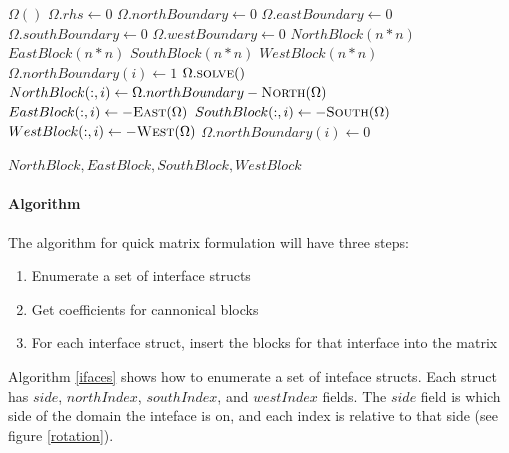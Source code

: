 \documentclass[12pt]{article}
\begin{document}
\begin{algorithm}
\caption{}
\label{getblocks}
\begin{algorithmic}[1]
    \State $\Omega()$ 
    \State $\Omega.rhs \gets 0$
    \State $\Omega.northBoundary \gets 0$
    \State $\Omega.eastBoundary \gets 0$
    \State $\Omega.southBoundary \gets 0$
    \State $\Omega.westBoundary \gets 0$
    \State $NorthBlock(n*n)$ 
    \State $EastBlock(n*n)$
    \State $SouthBlock(n*n)$
    \State $WestBlock(n*n)$
         \State $\Omega.northBoundary(i) \gets 1$
         \State $\Omega.\Call{solve}{ }$
         \State $NorthBlock(:,i) \gets \Omega.northBoundary - \Call{North}{\Omega}$
         \State $EastBlock(:,i) \gets -\Call{East}{\Omega}$
         \State $SouthBlock(:,i) \gets -\Call{South}{\Omega}$
         \State $WestBlock(:,i) \gets -\Call{West}{\Omega}$
         \State $\Omega.northBoundary(i) \gets 0$
    \EndFor

    \State \Return $NorthBlock, EastBlock, SouthBlock, WestBlock$
    \EndProcedure
\end{algorithmic}
\end{algorithm}
\paragraph{Algorithm}
The algorithm for quick matrix formulation will have three steps:
\begin{enumerate}
    \item Enumerate a set of interface structs
    \item Get coefficients for cannonical blocks
    \item For each interface struct, insert the blocks for that interface into the matrix
\end{enumerate}
Algorithm \ref{ifaces} shows how to enumerate a set of inteface structs. Each struct has 
$side$, $northIndex$, $southIndex$, and $westIndex$ fields. The $side$ field is which side of the
domain the inteface is on, and each index is relative to that side (see figure \ref{rotation}).
\end{document}
